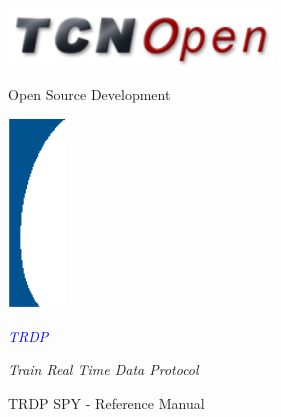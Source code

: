 \documentclass[a4paper]{book}
\newcommand{\documentTitle}{TRDP SPY - Reference Manual}
\begin{document}
\hypersetup{pageanchor=false,citecolor=blue}

\begin{titlepage}
\pagestyle{empty}

\hspace{-1cm}
\begin{minipage}[c]{0.40\linewidth}
\includegraphics[width=7cm]{TCNOpen}
\end{minipage}
\hspace{3.0cm}
\begin{minipage}[c]{0.70\linewidth}
{\huge Open Source Development}
\end{minipage}

\vspace{2.5cm}

\begin{minipage}[c]{2cm}
\includegraphics[width=1.5cm]{blueTitleGraphic}
\end{minipage}
\hspace{0.0cm}
\begin{minipage}[c]{0.90\linewidth}
\textcolor{Blue}{\fontsize{80}{80} \selectfont \emph{TRDP}}

\vspace*{1.0cm}

{\fontsize{24}{24} \selectfont \emph{Train Real Time Data Protocol}}

\end{minipage}

\vspace*{1.0cm}

\begin{center}
{\fontsize{38}{38} \selectfont \documentTitle}\\
\vspace*{1cm}
\end{center}


\end{titlepage}

\pagestyle{fancy}

\clearemptydoublepage
{}
\tableofcontents
\clearemptydoublepage
{}
\hypersetup{pageanchor=true,citecolor=blue}
\end{document}

